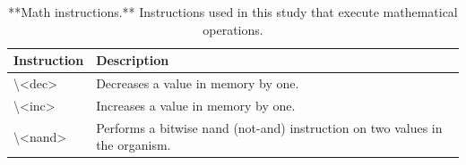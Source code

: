 \documentclass[
]{book}
\begin{document}
\begin{table}

\caption{\label{tab:Avida-instructions-Math-Table}**Math instructions.** Instructions used in this study that execute mathematical operations.}
\centering
\begin{tabular}[t]{ll}
\toprule
Instruction & Description\\
\midrule
\textbackslash{}<dec> & Decreases a value in memory by one.\\
\textbackslash{}<inc> & Increases a value in memory by one.\\
\textbackslash{}<nand> & Performs a bitwise nand (not-and) instruction on two values in the organism.\\
\bottomrule
\end{tabular}
\end{table}
\end{document}

